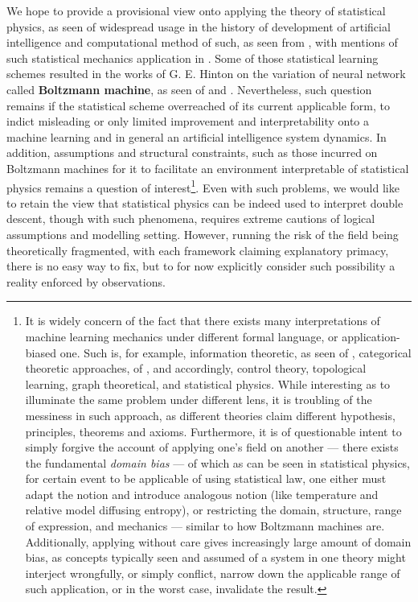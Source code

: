 We hope to provide a provisional view onto applying the theory of statistical physics, as seen of widespread usage in the history of development of artificial intelligence and computational method of such, as seen from \cite{hopfield_1982,amit1985spin,gardner1988optimal,seung1992statistical,mezard1987spin,mezard2009information,engel2001statistical,advani2013statistical,bahri2020statmech,mehta2014exact,advani2017high,li2021statmechdeep,cavity_tutorial_delFerraro}, with mentions of such statistical mechanics application in \cite{roberts2021principles}. Some of those statistical learning schemes resulted in the works of G. E. Hinton on the variation of neural network called \textbf{Boltzmann machine}, as seen of \cite{ackley1985learning} and \cite{hinton2012practical}. Nevertheless, such question remains if the statistical scheme overreached of its current applicable form, to indict misleading or only limited improvement and interpretability onto a machine learning and in general an artificial intelligence system dynamics. In addition, assumptions and structural constraints, such as those incurred on Boltzmann machines for it to facilitate an environment interpretable of statistical physics remains a question of interest\footnote{It is widely concern of the fact that there exists many interpretations of machine learning mechanics under different formal language, or application-biased one. Such is, for example, information theoretic, as seen of \cite{RussoZou:2016:InformationTheory,XuRaginsky:2017:InfoGen}, categorical theoretic approaches, of \cite{Manin_2024}, and accordingly, control theory, topological learning, graph theoretical, and statistical physics. While interesting as to illuminate the same problem under different lens, it is troubling of the messiness in such approach, as different theories claim different hypothesis, principles, theorems and axioms. Furthermore, it is of questionable intent to simply forgive the account of applying one's field on another --- there exists the fundamental \textit{domain bias} --- of which as can be seen in statistical physics, for certain event to be applicable of using statistical law, one either must adapt the notion and introduce analogous notion (like temperature and relative model diffusing entropy), or restricting the domain, structure, range of expression, and mechanics --- similar to how Boltzmann machines are. Additionally, applying without care gives increasingly large amount of domain bias, as concepts typically seen and assumed of a system in one theory might interject wrongfully, or simply conflict, narrow down the applicable range of such application, or in the worst case, invalidate the result.}. Even with such problems, we would like to retain the view that statistical physics can be indeed used to interpret double descent, though with such phenomena, requires extreme cautions of logical assumptions and modelling setting. However, running the risk of the field being theoretically fragmented, with each framework claiming explanatory primacy, there is no easy way to fix, but to for now explicitly consider such possibility a reality enforced by observations. 

